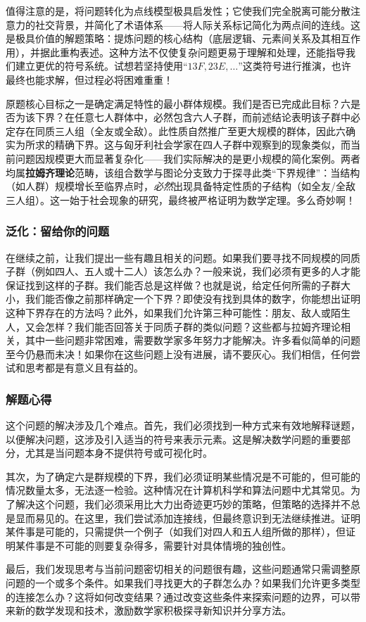 值得注意的是，将问题转化为点线模型极具启发性；它使我们完全脱离可能分散注意力的社交背景，并简化了术语体系——将人际关系标记简化为两点间的连线。这是极具价值的解题策略：提炼问题的核心结构（底层逻辑、元素间关系及其相互作用），并据此重构表述。这种方法不仅使复杂问题更易于理解和处理，还能指导我们建立更优的符号系统。试想若坚持使用``$13F, 23E, \dots$''这类符号进行推演，也许最终也能求解，但过程必将困难重重！

原题核心目标之一是确定满足特性的最小群体规模。我们是否已完成此目标？六是否为该下界？在任意七人群体中，必然包含六人子群，而前述结论表明该子群中必定存在同质三人组（全友或全敌）。此性质自然推广至更大规模的群体，因此六确实为所求的精确下界。这与匈牙利社会学家在四人子群中观察到的现象类似，而当前问题因规模更大而显著复杂化——我们实际解决的是更小规模的简化案例。两者均属\textbf{拉姆齐理论}范畴，该组合数学与图论分支致力于探寻此类``下界规律''：当结构（如人群）规模增长至临界点时，\emph{必然}出现具备特定性质的子结构（如全友/全敌三人组）。这一始于社会现象的研究，最终被严格证明为数学定理。多么奇妙啊！

\subsubsection*{泛化：留给你的问题}

在继续之前，让我们提出一些有趣且相关的问题。如果我们要寻找不同规模的同质子群（例如四人、五人或十二人）该怎么办？一般来说，我们必须有更多的人才能保证找到这样的子群。我们能否总是这样做？也就是说，给定任何所需的子群大小，我们能否像之前那样确定一个下界？即使没有找到具体的数字，你能想出证明这种下界存在的方法吗？此外，如果我们允许第三种可能性：朋友、敌人或陌生人，又会怎样？我们能否回答关于同质子群的类似问题？这些都与拉姆齐理论相关，其中一些问题非常困难，需要数学家多年努力才能解决。许多看似简单的问题至今仍悬而未决！如果你在这些问题上没有进展，请不要灰心。我们相信，任何尝试和思考都是有意义且有益的。

\subsubsection*{解题心得}

这个问题的解决涉及几个难点。首先，我们必须找到一种方式来有效地解释谜题，以便解决问题，这涉及引入适当的符号来表示元素。这是解决数学问题的重要部分，尤其是当问题本身不提供符号或可视化时。

其次，为了确定六是群规模的下界，我们必须证明某些情况是不可能的，但可能的情况数量太多，无法逐一检验。这种情况在计算机科学和算法问题中尤其常见。为了解决这个问题，我们必须采用比大力出奇迹更巧妙的策略，但策略的选择并不总是显而易见的。在这里，我们尝试添加连接线，但最终意识到无法继续推进。证明某件事是可能的，只需提供一个例子（如我们对四人和五人组所做的那样），但证明某件事是不可能的则要复杂得多，需要针对具体情境的独创性。

最后，我们发现思考与当前问题密切相关的问题很有趣，这些问题通常只需调整原问题的一个或多个条件。如果我们寻找更大的子群怎么办？如果我们允许更多类型的连接怎么办？这将如何改变结果？通过改变这些条件来探索问题的边界，可以带来新的数学发现和技术，激励数学家积极探寻新知识并分享方法。
